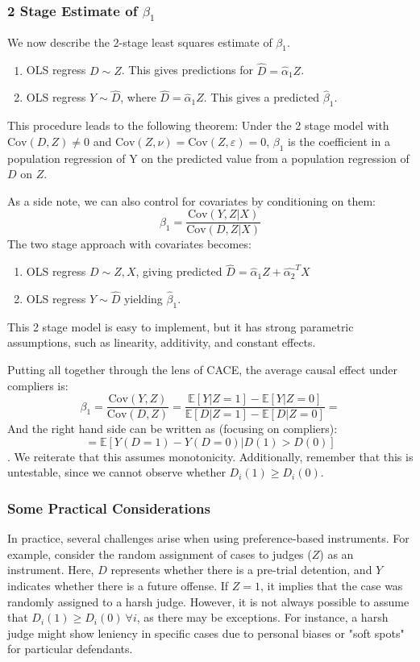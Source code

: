 \subsubsection{2 Stage Estimate of $\beta_1$}
We now describe the 2-stage least squares estimate of $\beta_1$.

\begin{enumerate}
    \item OLS regress $D \sim Z$. This gives predictions for $\hat{D} = \hat{\alpha}_1 Z$.
    \item OLS regress $Y \sim \hat{D}$, where $\hat{D} = \hat{\alpha}_1Z$. This gives a predicted $\hat{\beta}_1$.
\end{enumerate}

This procedure leads to the following theorem: Under the 2 stage model with $\text{Cov}(D,Z) \neq 0$ and $\text{Cov}(Z,\nu) = \text{Cov}(Z,\varepsilon) = 0$, $\beta_1$ is the coefficient in a population regression of Y on the predicted value from a population regression of $D$ on $Z$.

As a side note, we can also control for covariates by conditioning on them:
$$\beta_1 = \frac{\text{Cov}(Y, Z | X) }{\text{Cov}(D, Z | X)}$$
The two stage approach with covariates becomes:
\begin{enumerate}
    \item OLS regress $D \sim Z, X$, giving predicted $\hat{D} = \hat{\alpha}_1 Z + \hat{\alpha_2}^T X$
    \item OLS regress $Y \sim \hat{D}$ yielding $\hat{\beta}_1$. 

\end{enumerate}
This 2 stage model is easy to implement, but it has strong parametric assumptions, such as linearity, additivity, and constant effects.

Putting all together through the lens of CACE, the average causal effect under compliers is:
$$\beta_1 = \frac{\text{Cov}(Y, Z ) }{\text{Cov}(D, Z )} = \frac{\mathbb{E} [Y | Z = 1] - \mathbb{E} [Y | Z = 0]}{\mathbb{E} [D | Z = 1] - \mathbb{E} [D | Z = 0]} = $$
And the right hand side can be written as (focusing on compliers):
$$= \mathbb{E} [Y(D=1) - Y(D=0) | D(1) > D(0)]$$.
We reiterate that this assumes monotonicity. Additionally, remember that this is untestable, since we cannot observe whether $D_i(1) \geq D_i(0)$.

\subsubsection{Some Practical Considerations}  
In practice, several challenges arise when using preference-based instruments. For example, consider the random assignment of cases to judges (\(Z\)) as an instrument. Here, \(D\) represents whether there is a pre-trial detention, and \(Y\) indicates whether there is a future offense. If \(Z = 1\), it implies that the case was randomly assigned to a harsh judge. However, it is not always possible to assume that \(D_i(1) \geq D_i(0) \ \forall i\), as there may be exceptions. For instance, a harsh judge might show leniency in specific cases due to personal biases or "soft spots" for particular defendants.  

